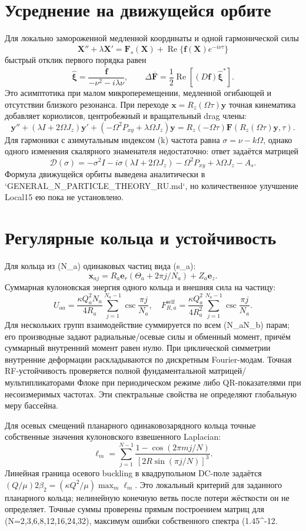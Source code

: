 \documentclass[11pt,a4paper]{article}
\begin{document}
\section{Усреднение на движущейся орбите}
Для локально замороженной медленной координаты и одной гармонической силы
\[
\mathbf X''+\lambda\mathbf X'=\mathbf F_s(\mathbf X)+\operatorname{Re}\{\mathbf f(\mathbf X)e^{-i\nu\tau}\}
\]
быстрый отклик первого порядка равен
\[
\widehat{\boldsymbol\xi}=\frac{\widehat{\mathbf f}}{-\nu^2-i\lambda\nu},\qquad
\Delta\overline{\mathbf F}=\frac12\operatorname{Re}[(D\mathbf f)\widehat{\boldsymbol\xi}^{*}].
\]
Это асимптотика при малом микроперемещении, медленной огибающей и отсутствии близкого резонанса. При переходе \(\mathbf x=R_z(\Omega\tau)\mathbf y\) точная кинематика добавляет кориолисов, центробежный и вращательный drag члены:
\[
\mathbf y''+(\lambda I+2\Omega J_z)\mathbf y'
+(-\Omega^2P_{xy}+\lambda\Omega J_z)\mathbf y
=R_z(-\Omega\tau)\mathbf F(R_z(\Omega\tau)\mathbf y,\tau).
\]
Для гармоники с азимутальным индексом (k) частота равна \(\sigma=\nu-k\Omega\), однако одного изменения скалярного знаменателя недостаточно: ответ задаётся матрицей
\[
\mathcal D(\sigma)=-\sigma^2I-i\sigma(\lambda I+2\Omega J_z)
-\Omega^2P_{xy}+\lambda\Omega J_z-A_s.
\]
Формула движущейся орбиты выведена аналитически в `GENERAL_N_PARTICLE_THEORY_RU.md`, но количественное улучшение Local15 ею пока не установлено.

\section{Регулярные кольца и устойчивость}
Для кольца из (N_a) одинаковых частиц вида (s_a):
\[
\mathbf x_{aj}=R_a\mathbf e_r(\Theta_a+2\pi j/N_a)+Z_a\mathbf e_z.
\]
Суммарная кулоновская энергия одного кольца и внешняя сила на частицу:
\[
U_{aa}=\frac{\kappa Q_a^2N_a}{4R_a}\sum_{j=1}^{N_a-1}\csc\frac{\pi j}{N_a},\quad
F^{\mathrm{self}}_{R,a}=\frac{\kappa Q_a^2}{4R_a^2}\sum_{j=1}^{N_a-1}\csc\frac{\pi j}{N_a}.
\]
Для нескольких групп взаимодействие суммируется по всем (N_aN_b) парам; его производные задают радиальные/осевые силы и обменный момент, причём суммарный внутренний момент равен нулю. При циклической симметрии внутренние деформации раскладываются по дискретным Fourier-модам. Точная RF-устойчивость проверяется полной фундаментальной матрицей/мультипликаторами Флоке при периодическом режиме либо QR-показателями при несоизмеримых частотах. Эти спектральные свойства не определяют глобальную меру бассейна.

Для осевых смещений планарного одинаковозарядного кольца точные собственные значения кулоновского взвешенного Laplacian:
\[
\ell_m=\sum_{j=1}^{N-1}\frac{1-\cos(2\pi mj/N)}{[2R\sin(\pi j/N)]^3}.
\]
Линейная граница осевого buckling в квадрупольном DC-поле задаётся \((Q/\mu)2\beta_2=(\kappa Q^2/\mu)\max_m\ell_m\). Это локальный критерий для заданного планарного кольца; нелинейную конечную ветвь после потери жёсткости он не определяет. Точные суммы проверены прямым построением матриц для (N=2,3,6,8,12,16,24,32), максимум ошибки собственного спектра (1.45^{-12}\).
\end{document}
